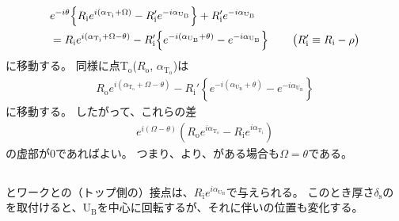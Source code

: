 \begin{align}
  \notag
  & e^{-i\theta}\!
    \left\{R_\mathrm ie^{i(\alpha_{\mathrm T_\mathrm i}+\Omega)}
           -R_\mathrm i'e^{-i\alpha_{\mathrm U_\mathrm B}}\right\}
    +R_\mathrm i'e^{-i\alpha_{\mathrm U_\mathrm B}}\\
  & = R_\mathrm ie^{i(\alpha_{\mathrm T_\mathrm i}+\Omega-\theta)}
      -R_\mathrm i'\!
       \left\{e^{-i(\alpha_{\mathrm U_\mathrm B}+\theta)}-e^{-i\alpha_{\mathrm U_\mathrm B}}\right\}\qquad
    \big(R_\mathrm i' \equiv R_\mathrm i-\rho\big)
    \label{eq:afterftUfinite}
\end{align}
に移動する。
同様に点T$_\mathrm o$($R_\mathrm o$, $\alpha_{\mathrm T_\mathrm o}$)は
\begin{align*}
  R_\mathrm oe^{i(\alpha_{\mathrm T_\mathrm o}+\Omega-\theta)}
  -R_\mathrm i'\!
   \left\{e^{-i(\alpha_{\mathrm U_\mathrm B} + \theta)} - e^{-i\alpha_{\mathrm U_\mathrm B}}\right\}
\end{align*}
に移動する。
したがって、これらの差
\begin{align*}
  e^{i(\Omega-\theta)}
  \left(R_\mathrm oe^{i\alpha_{\mathrm T_\mathrm o}} - R_\mathrm ie^{i\alpha_{\mathrm T_\mathrm i}}\right)
\end{align*}
の虚部が0であればよい。
つまり、より、\ReceiverPlate がある場合も$\Omega = \theta$である。


\subsection{\ReceiverPlateContactPoint}
\ReceiverPlate とワークとの（トップ側の）接点は、$R_\mathrm ie^{i\alpha_{\mathrm U_\mathrm B}}$で与えられる。
このとき厚さ$\delta_\mathrm s$の\Spacer を取付けると、U$_\mathrm B$を中心に回転するが、それに伴い\ReceiverPlateContactPoint の位置も変化する。


